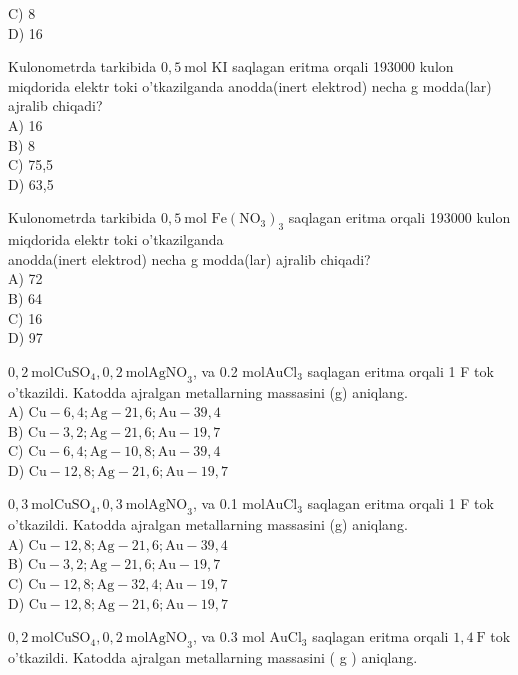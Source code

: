 C) 8\\
D) 16
  \item Kulonometrda tarkibida $0,5 \mathrm{~mol}$ KI saqlagan eritma orqali 193000 kulon miqdorida elektr toki o'tkazilganda anodda(inert elektrod) necha g modda(lar) ajralib chiqadi?\\
A) 16\\
B) 8\\
C) 75,5\\
D) 63,5
  \item Kulonometrda tarkibida $0,5 \mathrm{~mol}$ $\mathrm{Fe}\left(\mathrm{NO}_{3}\right)_{3}$ saqlagan eritma orqali 193000 kulon miqdorida elektr toki o'tkazilganda\\
anodda(inert elektrod) necha g modda(lar) ajralib chiqadi?\\
A) 72\\
B) 64\\
C) 16\\
D) 97
  \item $0,2 \mathrm{~mol} \mathrm{CuSO}_{4}, 0,2 \mathrm{~mol} \mathrm{AgNO}_{3}$, va 0.2 $\mathrm{mol} \mathrm{AuCl}_{3}$ saqlagan eritma orqali 1 F tok o'tkazildi. Katodda ajralgan metallarning massasini (g) aniqlang.\\
A) $\mathrm{Cu}-6,4 ; \mathrm{Ag}-21,6 ; \mathrm{Au}-39,4$\\
B) $\mathrm{Cu}-3,2 ; \mathrm{Ag}-21,6 ; \mathrm{Au}-19,7$\\
C) $\mathrm{Cu}-6,4 ; \mathrm{Ag}-10,8 ; \mathrm{Au}-39,4$\\
D) $\mathrm{Cu}-12,8 ; \mathrm{Ag}-21,6 ; \mathrm{Au}-19,7$\\
  \item $0,3 \mathrm{~mol} \mathrm{CuSO}_{4}, 0,3 \mathrm{~mol} \mathrm{AgNO}_{3}$, va 0.1 $\mathrm{mol} \mathrm{AuCl}_{3}$ saqlagan eritma orqali 1 F tok o'tkazildi. Katodda ajralgan metallarning massasini (g) aniqlang.\\
A) $\mathrm{Cu}-12,8 ; \mathrm{Ag}-21,6 ; \mathrm{Au}-39,4$\\
B) $\mathrm{Cu}-3,2 ; \mathrm{Ag}-21,6 ; \mathrm{Au}-19,7$\\
C) $\mathrm{Cu}-12,8 ; \mathrm{Ag}-32,4 ; \mathrm{Au}-19,7$\\
D) $\mathrm{Cu}-12,8 ; \mathrm{Ag}-21,6 ; \mathrm{Au}-19,7$
  \item $0,2 \mathrm{~mol} \mathrm{CuSO}_{4}, 0,2 \mathrm{~mol} \mathrm{AgNO}_{3}$, va 0.3 mol $\mathrm{AuCl}_{3}$ saqlagan eritma orqali $1,4 \mathrm{~F}$ tok o'tkazildi. Katodda ajralgan metallarning massasini ( g ) aniqlang.\\

